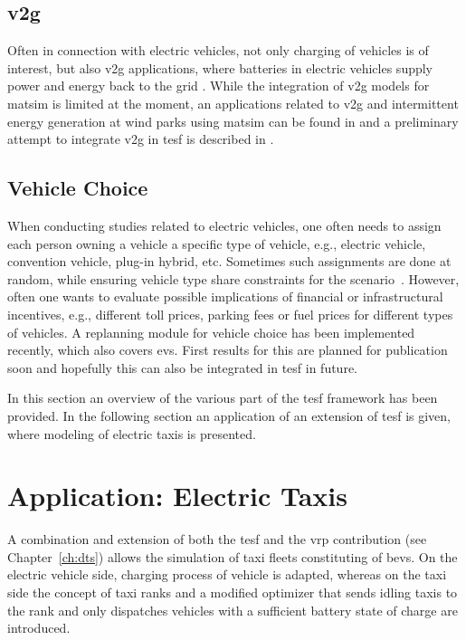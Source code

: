 \subsection{\protect\gls{v2g}}
Often in connection with electric vehicles, not only charging of vehicles is of interest, but also \gls{v2g} applications, where batteries in electric vehicles supply power and energy back to the grid \citep[][]{KemptonTomic_JPS_2005}. While the integration of \gls{v2g} models for \gls{matsim} is limited at the moment, an applications related to \gls{v2g} and intermittent energy generation at wind parks using \gls{matsim} can be found in \citet[][]{GalusAndersson_CIGRE_2011} and a preliminary attempt to integrate \gls{v2g} in \gls{tesf} is described in \citet[][]{WaraichEtAl_JanssensEtAl_2014, Schieffer_MastersThesis_2011}.

\subsection{Vehicle Choice}
When conducting studies related to electric vehicles, one often needs to assign each person owning a vehicle a specific type of vehicle, e.g., electric vehicle, convention vehicle, plug-in hybrid, etc. Sometimes such assignments are done at random, while ensuring vehicle type share constraints for the scenario \,\citep[e.g.,][]{WaraichEtAl_JanssensEtAl_2014}. However, often one wants to evaluate possible implications of financial or infrastructural incentives, e.g., different toll prices, parking fees or fuel prices for different types of vehicles. A replanning module for vehicle choice has been implemented recently, which also covers \glspl{ev}. First results for this are planned for publication soon and hopefully this can also be integrated in \gls{tesf} in future.

In this section an overview of the various part of the \gls{tesf} framework has been provided. In the following section an application of an extension of \gls{tesf} is given, where modeling of electric taxis is presented.

\section{Application: Electric Taxis} %
A combination and extension of both the \gls{tesf} and the \gls{vrp} contribution (see Chapter~\ref{ch:dts}) allows the simulation of taxi fleets constituting of \glspl{bev}.
On the electric vehicle side, charging process of vehicle is adapted, whereas on the taxi side the concept of taxi ranks and a modified optimizer that sends idling taxis to the rank and only dispatches vehicles with a sufficient battery state of charge are introduced. 


